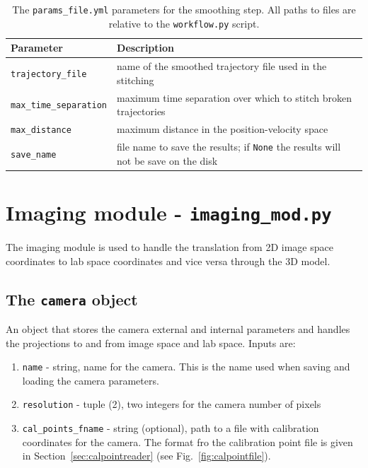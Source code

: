 \documentclass[10pt,a4paper]{article}
\begin{document}
\begin{table}[!ht]
	\centering
	\caption{The \texttt{params\_file.yml} parameters for the smoothing step. All paths to files are relative to the \texttt{workflow.py} script.}
	\begin{tabular}{l m{10cm}}
		\hline
		Parameter & Description\\
		\hline
		
		\texttt{trajectory\_file} & name of the smoothed trajectory file used in the stitching \\
		
		\texttt{max\_time\_separation} & maximum time separation over which to stitch broken trajectories \\
		
		\texttt{max\_distance} & maximum distance in the position-velocity space \\
		
		\texttt{save\_name} & file name to save the results; if \texttt{None} the results will not be save on the disk \\
		
		\hline
	\end{tabular}
\end{table}












\clearpage


\section{Imaging module - \texttt{imaging\_mod.py}}\label{sec:image_mod}


The imaging module is used to handle the translation from 2D image space coordinates to lab space coordinates and vice versa through the 3D model. 



\subsection{The \texttt{camera} object}\label{sec:camera}

An object that stores the camera external and internal parameters and handles the projections to and from image space and lab space. Inputs are:

\begin{enumerate}
	\item \texttt{name} - string, name for the camera. This is the name used when saving and loading the camera parameters.
	\item \texttt{resolution} - tuple (2), two integers for the camera number of pixels
	\item \texttt{cal\_points\_fname} - string (optional), path to a file with calibration coordinates for the camera. The format fro the calibration point file is given in Section~\ref{sec:calpointreader} (see Fig.~\ref{fig:calpointfile}).
\end{enumerate}
\end{document}
